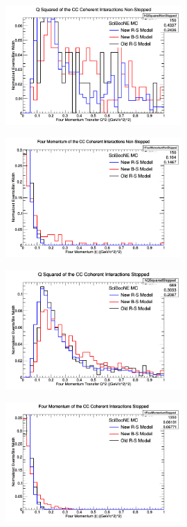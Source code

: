 \documentclass[11pt]{article}
\begin{document}
\begin{figure}[H]
\centering
\includegraphics[width=0.6\textwidth]{NMFourSquaredPlottingImages/1-NMFourSquaredPlotting.png}
\caption{}
\end{figure}

\begin{figure}[H]
\centering
\includegraphics[width=0.6\textwidth]{NMFourSquaredPlottingImages/2-NMFourSquaredPlotting.png}
\caption{}
\end{figure}

\begin{figure}[H]
\centering
\includegraphics[width=0.6\textwidth]{NMFourSquaredPlottingImages/3-NMFourSquaredPlotting.png}
\caption{}
\end{figure}

\begin{figure}[H]
\centering
\includegraphics[width=0.6\textwidth]{NMFourSquaredPlottingImages/4-NMFourSquaredPlotting.png}
\caption{}
\end{figure}
\end{document}

